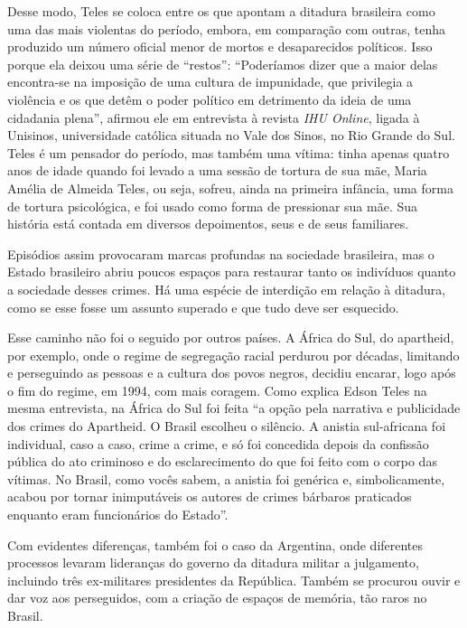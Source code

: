 \documentclass[12pt]{extarticle}
\begin{document}
Desse modo, Teles se coloca entre os que apontam a ditadura brasileira
como uma das mais violentas do período, embora, em comparação com
outras, tenha produzido um número oficial menor de mortos e
desaparecidos políticos. Isso porque ela deixou uma série de ``restos'':
``Poderíamos dizer que a maior delas encontra-se na imposição de uma
cultura de impunidade, que privilegia a violência e os que detêm o poder
político em detrimento da ideia de uma cidadania plena'', afirmou ele em
entrevista à revista \emph{IHU Online}, ligada à Unisinos, universidade
católica situada no Vale dos Sinos, no Rio Grande do Sul. Teles é um
pensador do período, mas também uma vítima: tinha apenas quatro anos de
idade quando foi levado a uma sessão de tortura de sua mãe, Maria Amélia
de Almeida Teles, ou seja, sofreu, ainda na primeira infância, uma forma
de tortura psicológica, e foi usado como forma de pressionar sua mãe.
Sua história está contada em diversos depoimentos, seus e de seus
familiares.



Episódios assim provocaram marcas profundas na sociedade brasileira, mas
o Estado brasileiro abriu poucos espaços para restaurar tanto os
indivíduos quanto a sociedade desses crimes. Há uma espécie de
interdição em relação à ditadura, como se esse fosse um assunto superado
e que tudo deve ser esquecido.

Esse caminho não foi o seguido por outros países. A África do Sul, do
apartheid, por exemplo, onde o regime de segregação racial perdurou por
décadas, limitando e perseguindo as pessoas e a cultura dos povos
negros, decidiu encarar, logo após o fim do regime, em 1994, com mais
coragem. Como explica Edson Teles na mesma entrevista, na África do Sul
foi feita ``a opção pela narrativa e publicidade dos crimes do
Apartheid. O Brasil escolheu o silêncio. A anistia sul-africana foi
individual, caso a caso, crime a crime, e só foi concedida depois da
confissão pública do ato criminoso e do esclarecimento do que foi feito
com o corpo das vítimas. No Brasil, como vocês sabem, a anistia foi
genérica e, simbolicamente, acabou por tornar inimputáveis os autores de
crimes bárbaros praticados enquanto eram funcionários do Estado''.

Com evidentes diferenças, também foi o caso da Argentina, onde
diferentes processos levaram lideranças do governo da ditadura militar a
julgamento, incluindo três ex-militares presidentes da República. Também
se procurou ouvir e dar voz aos perseguidos, com a criação de espaços de
memória, tão raros no Brasil.
\end{document}

